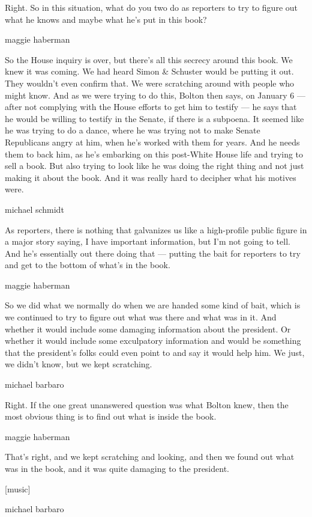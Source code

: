 Right. So in this situation, what do you two do as reporters to try to
figure out what he knows and maybe what he's put in this book?

maggie haberman

So the House inquiry is over, but there's all this secrecy around this
book. We knew it was coming. We had heard Simon \& Schuster would be
putting it out. They wouldn't even confirm that. We were scratching
around with people who might know. And as we were trying to do this,
Bolton then says, on January 6 --- after not complying with the House
efforts to get him to testify --- he says that he would be willing to
testify in the Senate, if there is a subpoena. It seemed like he was
trying to do a dance, where he was trying not to make Senate Republicans
angry at him, when he's worked with them for years. And he needs them to
back him, as he's embarking on this post-White House life and trying to
sell a book. But also trying to look like he was doing the right thing
and not just making it about the book. And it was really hard to
decipher what his motives were.

michael schmidt

As reporters, there is nothing that galvanizes us like a high-profile
public figure in a major story saying, I have important information, but
I'm not going to tell. And he's essentially out there doing that ---
putting the bait for reporters to try and get to the bottom of what's in
the book.

maggie haberman

So we did what we normally do when we are handed some kind of bait,
which is we continued to try to figure out what was there and what was
in it. And whether it would include some damaging information about the
president. Or whether it would include some exculpatory information and
would be something that the president's folks could even point to and
say it would help him. We just, we didn't know, but we kept scratching.

michael barbaro

Right. If the one great unanswered question was what Bolton knew, then
the most obvious thing is to find out what is inside the book.

maggie haberman

That's right, and we kept scratching and looking, and then we found out
what was in the book, and it was quite damaging to the president.

{[}music{]}

michael barbaro


